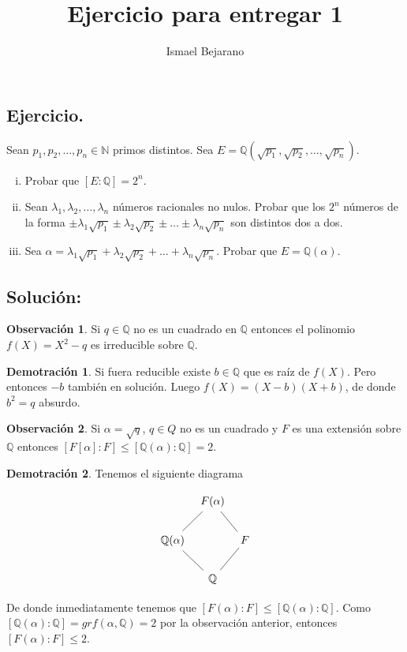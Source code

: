 \documentclass{article}
\title{Ejercicio para entregar 1}
\author{Ismael Bejarano}
\date{}
\def\N{\mathbb{N}}
\def\Q{\mathbb{Q}}
\def\p[#1]{\sqrt{p_{#1}}}
\def\l[#1]{\lambda_{#1}}
\theoremstyle{definition}
\newtheorem{obs}{Observación}
\newtheorem*{demo}{Demotración}
\begin{document}
\maketitle

\subsection*{Ejercicio.} Sean $p_1, p_2, \dots, p_n \in \N$ primos distintos. 
Sea $E = \Q(\p[1],\p[2],\dots,\p[n])$.

\begin{enumerate}[(i)]
\item Probar que $[E : \Q] = 2^n$.
\item Sean $\l[1], \l[2], \dots, \l[n]$ números racionales no nulos. Probar
que los $2^n$ números de la forma 
$\pm\l[1]\p[1] \pm\l[2]\p[2] \pm \dots \pm\l[n]\p[n]$ son distintos dos a dos.
\item Sea $\alpha = \l[1]\p[1] + \l[2]\p[2] + \dots + \l[n]\p[n]$. Probar
que $E = \Q(\alpha)$.
\end{enumerate}

\subsection*{Solución:}

\begin{obs} 

Si $q \in \Q$  no es un cuadrado en $\Q$ entonces el polinomio 
$f(X) = X^2 - q$ es irreducible sobre $\Q$.

\end{obs}

\begin{demo}

Si fuera reducible existe $b \in \Q$ que es raíz de $f(X)$.
Pero entonces $-b$ también en solución. Luego
$f(X) = (X - b)(X + b)$, de donde $b^2 = q$ absurdo.

\end{demo}

\begin{obs}

Si $\alpha=\sqrt{q}$, $q \in Q$ no es un cuadrado y 
$F$ es una extensión sobre $\Q$ entonces 
$[F[\alpha]:F] \le [\Q(\alpha):\Q] = 2$.

\end{obs}

\begin{demo}

Tenemos el siguiente diagrama

\[
\begin{tikzcd}[column sep=tiny]
    & F(\alpha) \arrow[ld, dash] \arrow[rd, dash] & \\
\Q(\alpha) \arrow[rd, dash] & & F \arrow[ld, dash] \\
& \Q & 
\end{tikzcd}
\]

De donde inmediatamente tenemos que $[F(\alpha):F] \le [\Q(\alpha):\Q]$.
Como $[\Q(\alpha):\Q] = gr f(\alpha,\Q) = 2$ por la observación
anterior, entonces $[F(\alpha):F] \le 2$.

\end{demo}
\end{document}
